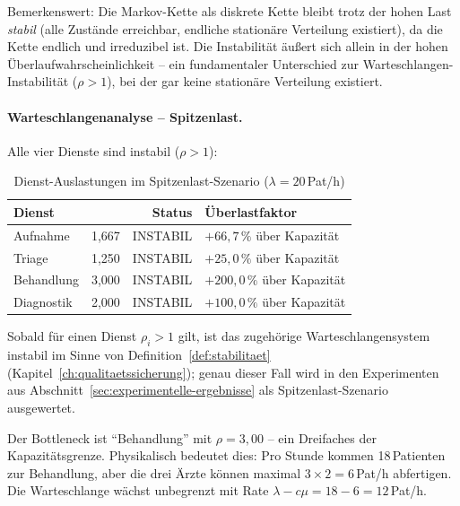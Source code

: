 ﻿\documentclass[a4paper,12pt]{report}
\theoremstyle{definition}
\begin{document}
Bemerkenswert: Die Markov-Kette als diskrete Kette bleibt trotz der hohen
Last \emph{stabil} (alle Zustände erreichbar, endliche stationäre Verteilung
existiert), da die Kette endlich und irreduzibel ist. Die Instabilität
äußert sich allein in der hohen Überlaufwahrscheinlichkeit -- ein
fundamentaler Unterschied zur Warteschlangen-Instabilität ($\rho > 1$),
bei der gar keine stationäre Verteilung existiert.

\paragraph{Warteschlangenanalyse -- Spitzenlast.}
Alle vier Dienste sind instabil ($\rho > 1$):

\begin{table}[H]
	\centering
	\begin{tabular}{@{}lrrl@{}}
		\toprule
		\textbf{Dienst} & \boldmath{$\rho$} & \textbf{Status} & \textbf{Überlastfaktor} \\
		\midrule
		Aufnahme   & 1{,}667 & INSTABIL & $+66{,}7\,\%$ über Kapazität \\
		Triage     & 1{,}250 & INSTABIL & $+25{,}0\,\%$ über Kapazität \\
		Behandlung & 3{,}000 & INSTABIL & $+200{,}0\,\%$ über Kapazität \\
		Diagnostik & 2{,}000 & INSTABIL & $+100{,}0\,\%$ über Kapazität \\
		\bottomrule
	\end{tabular}
	\caption{Dienst-Auslastungen im Spitzenlast-Szenario ($\lambda = 20$\,Pat/h)}
\label{tab:dienst-auslastung-spitzenlast}
	\label{tab:auslastung-hochlast}
\end{table}

Sobald für einen Dienst $\rho_i > 1$ gilt, ist das zugehörige Warteschlangensystem instabil im Sinne von Definition~\ref{def:stabilitaet} (Kapitel~\ref{ch:qualitaetssicherung}); genau dieser Fall wird in den Experimenten aus Abschnitt~\ref{sec:experimentelle-ergebnisse} als Spitzenlast-Szenario ausgewertet.

Der Bottleneck ist ``Behandlung'' mit $\rho = 3{,}00$ -- ein Dreifaches
der Kapazitätsgrenze. Physikalisch bedeutet dies: Pro Stunde kommen
18\,Patienten zur Behandlung, aber die drei Ärzte können maximal
$3 \times 2 = 6$\,Pat/h abfertigen. Die Warteschlange wächst
unbegrenzt mit Rate $\lambda - c\mu = 18 - 6 = 12$\,Pat/h.
\end{document}
